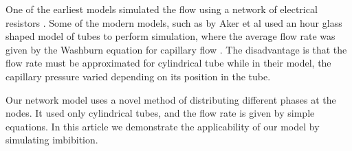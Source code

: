 	One of the earliest models simulated the flow using a network of electrical resistors \cite{fatt1956network}. Some of the modern models, such as by Aker et al \cite{aker1998two} used an hour glass shaped model of tubes  to perform simulation, where the average flow rate was given by the Washburn equation for capillary flow \cite{washburn1921dynamics}. The disadvantage is that the flow rate must be approximated for cylindrical tube while in their model, the capillary pressure varied depending on its position in the tube.
	
	Our network model uses a novel method of distributing different phases at the nodes. It used only cylindrical tubes, and the flow rate is given by simple equations. In this article we demonstrate the applicability of our model by simulating imbibition.
	

	
	
